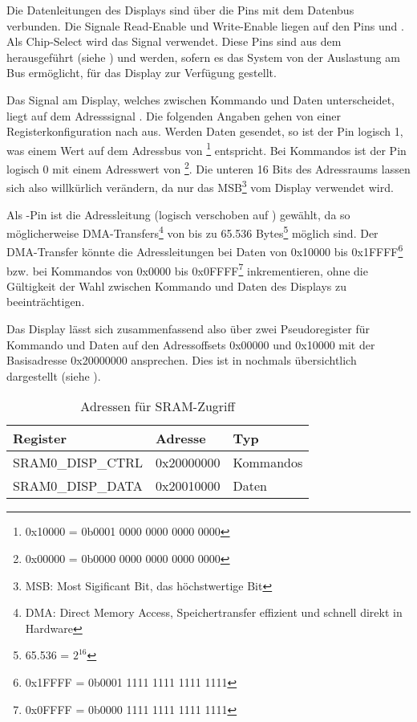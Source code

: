 Die Datenleitungen des Displays sind über die Pins  mit dem Datenbus verbunden. Die Signale Read-Enable  und Write-Enable  liegen auf den Pins  und . Als Chip-Select wird das Signal  verwendet. Diese Pins sind aus dem  herausgeführt (siehe ) und werden, sofern es das System von der Auslastung am Bus ermöglicht, für das Display zur Verfügung gestellt.

Das  Signal am Display, welches zwischen Kommando und Daten unterscheidet, liegt auf dem Adresssignal . Die folgenden Angaben gehen von einer Registerkonfiguration nach  aus. Werden Daten gesendet, so ist der Pin logisch 1, was einem Wert auf dem Adressbus von \footnote{0x10000 = 0b0001 0000 0000 0000 0000} entspricht. Bei Kommandos ist der Pin logisch 0 mit einem Adresswert von \footnote{0x00000 = 0b0000 0000 0000 0000 0000}. Die unteren 16 Bits des Adressraums lassen sich also willkürlich verändern, da nur das MSB\footnote{MSB: Most Sigificant Bit, das höchstwertige Bit} vom Display verwendet wird. 

Als -Pin ist die Adressleitung  (logisch verschoben auf ) gewählt, da so möglicherweise DMA-Transfers\footnote{DMA: Direct Memory Access, Speichertransfer effizient und schnell direkt in Hardware} von bis zu 65.536 Bytes\footnote{65.536 = $2^{16}$} möglich sind. Der DMA-Transfer könnte die Adressleitungen bei Daten von 0x10000 bis 0x1FFFF\footnote{0x1FFFF = 0b0001 1111 1111 1111 1111} bzw. bei Kommandos von 0x0000 bis 0x0FFFF\footnote{0x0FFFF = 0b0000 1111 1111 1111 1111} inkrementieren, ohne die Gültigkeit der Wahl zwischen Kommando und Daten des Displays zu beeinträchtigen.

Das Display lässt sich zusammenfassend also über zwei Pseudoregister für Kommando und Daten auf den Adressoffsets 0x00000 und 0x10000 mit der Basisadresse 0x20000000 ansprechen. Dies ist in  nochmals übersichtlich dargestellt (siehe \cite{NXP2010}).

\begin{table}[h]
\begin{tabular}{|p{4.5cm}|p{4cm}|p{4cm}|}\hline
\rowcolor{TableBackgroundColor} 
	\textbf{Register} 	& \textbf{Adresse} 	& \textbf{Typ} 			\\ \hline
	SRAM0\_DISP\_CTRL 	& 0x20000000		& Kommandos				\\ \hline
	SRAM0\_DISP\_DATA 	& 0x20010000 		& Daten 				\\ \hline
\end{tabular}
\caption{Adressen für SRAM-Zugriff}
\label{tab:sram_adressen}
\end{table}


